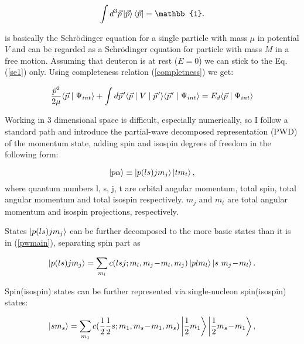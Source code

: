     \begin{equation}
        \int d^3\vec{p} \ket{\vec{p}} \bra{\vec{p}}   = \mathbb{1}.
        \label{completness}
    \end{equation}

     is basically the Schr\"{o}dinger equation for a single particle with mass $\mu$
    in potential $V$ 
    and  can be regarded as a Schr\"{o}dinger equation for particle with mass $M$ in 
    a free motion. Assuming that deuteron is at rest ($E = 0$) we can stick 
    to the Eq.(\ref{se1}) only. Using completeness relation (\ref{completness}) we get:

    \begin{equation}
        \frac{\vec{p}^2}{2\mu} \langle \vec{p} \mid \Psi_{int} \rangle +
        \int d \pvec{p} \langle \vec{p} \mid V \mid \pvec{p} \rangle
        \langle \pvec{p} \mid \Psi_{int} \rangle = 
        E_d \langle \vec{p} \mid \Psi_{int} \rangle
        \label{shrod_old}
    \end{equation}

    Working in 3 dimensional space  is difficult, especially numerically,
    so I follow a standard path and introduce the partial-wave decomposed representation (PWD) 
    of the momentum state, adding spin and isospin degrees of freedom in the following form:

    \begin{equation}
        \ket{p \alpha} \equiv \ket{p (ls) j m_j}  \ket{t m_t},
        \label{pwmain}
    \end{equation}
    where quantum numbers l, s, j, t are orbital angular momentum, total spin,
    total angular momentum and total isospin respectively. $m_j$ and $m_t$ are 
    total angular momentum and isospin projections, respectively.


    States $\ket{p (ls) j m_j}$ can be further decomposed to 
    the more basic states than it is in (\ref{pwmain}), separating spin part as 
    
    \begin{equation}
        \ket{p (ls) j m_j} = \sum_{m_l} c(lsj;m_l, m_j\!-\!m_l, m_j) \ket{p l m_l}
        \ket{s~m_j\!-\!m_l}.
        \label{full_decomp}
    \end{equation}

    Spin(isospin) states can be further represented via single-nucleon spin(isospin) states:

    \begin{equation}
        \ket{s m_s} = \sum_{m_1} c(\frac{1}{2}\frac{1}{2}s;m_1, m_s\!-\!m_1, m_s)
        \ket{\frac{1}{2} m_1}
        \ket{\frac{1}{2} m_s\!-\!m_1},
        \label{spin_decomp}
    \end{equation}

